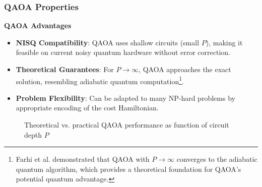 \subsubsection*{QAOA Properties}

\noindent
{}
\textbf{QAOA Advantages}
\begin{itemize}
  \item \textbf{NISQ Compatibility}: QAOA uses shallow circuits (small
    $P$), making it feasible on current noisy quantum hardware without error
    correction.

  \item \textbf{Theoretical Guarantees}: For $P \to \infty$, QAOA approaches the exact
    solution, resembling adiabatic quantum computation\footnote{Farhi et al.
      demonstrated that QAOA with $P \to \infty$ converges to the adiabatic
      quantum algorithm, which provides a theoretical foundation for QAOA's
    potential quantum advantage.}.

  \item \textbf{Problem Flexibility}: Can be adapted to many NP-hard problems
    by appropriate encoding of the cost Hamiltonian.

\end{itemize}



\vspace{0.3cm}

\begin{figure}[h]
  \centering
  \caption{Theoretical vs. practical QAOA performance as function of circuit
  depth $P$}
  \label{fig:qaoa-performance}
\end{figure}

